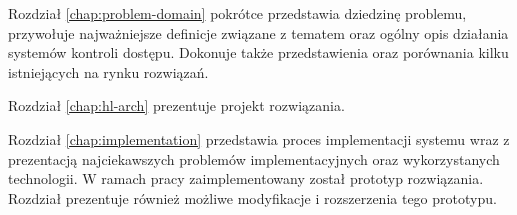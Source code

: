 	Rozdział \ref{chap:problem-domain} pokrótce przedstawia dziedzinę problemu, przywołuje najważniejsze definicje związane z tematem oraz ogólny opis działania systemów kontroli dostępu. Dokonuje także przedstawienia oraz porównania kilku istniejących na rynku rozwiązań.

	Rozdział \ref{chap:hl-arch} prezentuje projekt rozwiązania.

	Rozdział \ref{chap:implementation} przedstawia proces implementacji systemu wraz z prezentacją najciekawszych problemów implementacyjnych oraz wykorzystanych technologii. W ramach pracy zaimplementowany został prototyp rozwiązania. Rozdział prezentuje również możliwe modyfikacje i rozszerzenia tego prototypu.